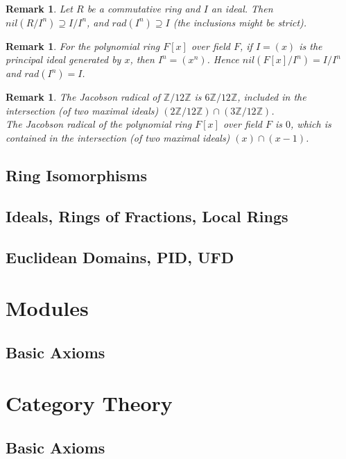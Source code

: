 \documentclass[a4paper,sfsidenotes,openany]{tufte-book}
\theoremstyle{theorem}
\newtheorem{remark}[theorem]{Remark}
\begin{document}
\begin{fullwidth}
\begin{remark}
Let $R$ be a commutative ring and $I$ an ideal. Then $nil(R/I^n) \supseteq I/I^n$, and $rad(I^n) \supseteq I$ (the inclusions might be strict).
\end{remark}
\>

\begin{remark}
For the polynomial ring $F[x]$ over field $F$, if $I=(x)$ is the principal ideal generated by $x$, then $I^n = (x^n)$. Hence $nil(F[x]/I^n)=I/I^n$	and $rad(I^n) = I$.
\end{remark}
\>

\begin{remark}
The Jacobson radical of $\mathbb{Z}/12\mathbb{Z}$ is $6\mathbb{Z}/12\mathbb{Z}$, included in the intersection (of two maximal ideals) $(2\mathbb{Z}/12\mathbb{Z}) \cap (3\mathbb{Z}/12\mathbb{Z})$.\\
The Jacobson radical of the polynomial ring $F[x]$ over field $F$ is $0$, which is contained in the intersection (of two maximal ideals) $(x) \cap (x-1)$.\\
\end{remark}
\>

\section{Ring Isomorphisms}

\section{Ideals, Rings of Fractions, Local Rings}

\section{Euclidean Domains, PID, UFD}

\end{fullwidth}

\newpage

\chapter{Modules}
\begin{fullwidth}
\section{Basic Axioms}

\end{fullwidth}

\newpage

\chapter{Category Theory}
\begin{fullwidth}
\section{Basic Axioms}

\end{fullwidth}

\newpage

\printindex
\end{document}
